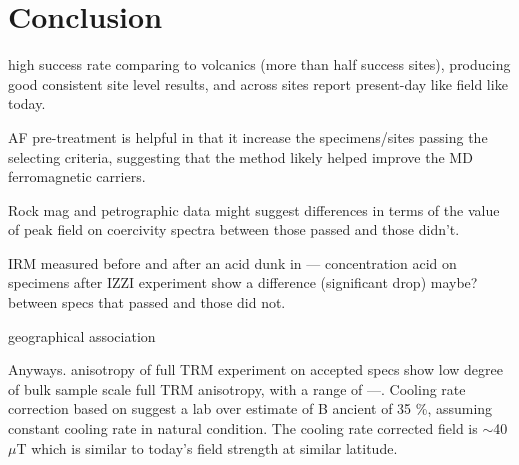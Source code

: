 \documentclass[draft]{agujournal2019}
\begin{document}







\section*{Conclusion}
high success rate comparing to volcanics (more than half success sites), producing good consistent site level results, and across sites report present-day like field like today.

AF pre-treatment is helpful in that it increase the specimens/sites passing the selecting criteria, suggesting that the method likely helped improve the MD ferromagnetic carriers. 

Rock mag and petrographic data might suggest differences in terms of the value of peak field on coercivity spectra between those passed and those didn't.  

IRM measured before and after an acid dunk in --- concentration acid on specimens after IZZI experiment show a difference (significant drop) maybe? between specs that passed and those did not.

geographical association

Anyways. anisotropy of full TRM experiment on accepted specs show low degree of bulk sample scale full TRM anisotropy, with a range of ---. Cooling rate correction based on \cite{Halgedahl1980a} suggest a lab over estimate of B ancient of 35 \%, assuming constant cooling rate in natural condition. The cooling rate corrected field is $\sim$40 $\mu$T which is similar to today's field strength at similar latitude. 
\end{document}
